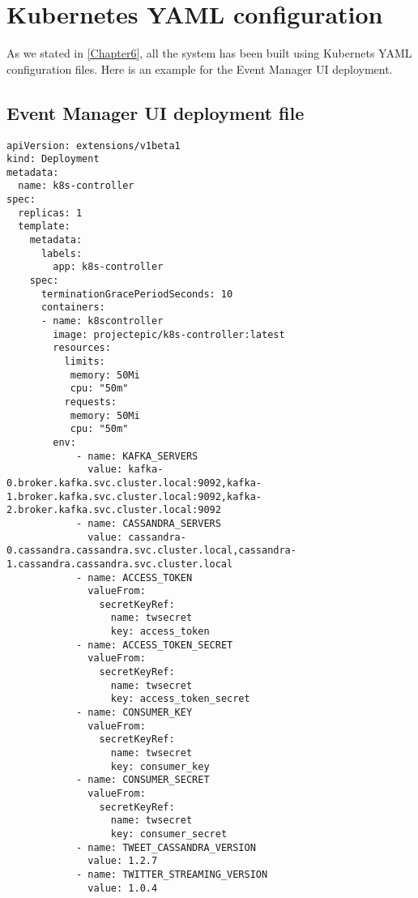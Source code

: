 
\chapter{Kubernetes YAML configuration} %

\label{AppendixB} %

As we stated in \autoref{Chapter6}, all the system has been built using Kubernets YAML configuration files. Here is an example for the Event Manager UI deployment.

\section{Event Manager UI deployment file}

\begin{lstlisting}[]
apiVersion: extensions/v1beta1
kind: Deployment
metadata:
  name: k8s-controller
spec:
  replicas: 1
  template:
    metadata:
      labels:
        app: k8s-controller
    spec:
      terminationGracePeriodSeconds: 10
      containers:
      - name: k8scontroller
        image: projectepic/k8s-controller:latest
        resources:
          limits:
           memory: 50Mi
           cpu: "50m"
          requests:
           memory: 50Mi
           cpu: "50m"
        env:
            - name: KAFKA_SERVERS
              value: kafka-0.broker.kafka.svc.cluster.local:9092,kafka-1.broker.kafka.svc.cluster.local:9092,kafka-2.broker.kafka.svc.cluster.local:9092
            - name: CASSANDRA_SERVERS
              value: cassandra-0.cassandra.cassandra.svc.cluster.local,cassandra-1.cassandra.cassandra.svc.cluster.local
            - name: ACCESS_TOKEN
              valueFrom:
                secretKeyRef:
                  name: twsecret
                  key: access_token
            - name: ACCESS_TOKEN_SECRET
              valueFrom:
                secretKeyRef:
                  name: twsecret
                  key: access_token_secret
            - name: CONSUMER_KEY
              valueFrom:
                secretKeyRef:
                  name: twsecret
                  key: consumer_key
            - name: CONSUMER_SECRET
              valueFrom:
                secretKeyRef:
                  name: twsecret
                  key: consumer_secret
            - name: TWEET_CASSANDRA_VERSION
              value: 1.2.7
            - name: TWITTER_STREAMING_VERSION
              value: 1.0.4
\end{lstlisting}

